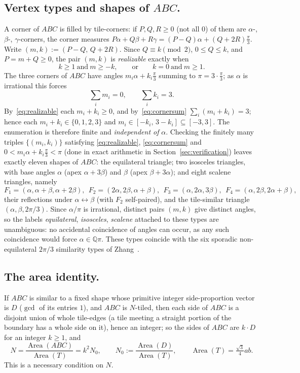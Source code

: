 \documentclass[11pt,reqno]{amsart}
\theoremstyle{plain}
\theoremstyle{definition}
\newcommand{\Q}{\mathbb{Q}}
\DeclareMathOperator{\Area}{Area}
\begin{document}
\subsection*{Vertex types and shapes of $ABC$.}\label{sub:shapes}
A corner of $ABC$ is filled by tile-corners: if $P,Q,R\ge0$ (not all $0$) of them are
$\alpha$-, $\beta$-, $\gamma$-corners, the corner measures
$P\alpha+Q\beta+R\gamma=(P-Q)\alpha+(Q+2R)\tfrac\pi3$. Write $(m,k):=(P-Q,\,Q+2R)$. Since $Q\equiv k
\pmod2$, $0\le Q\le k$, and $P=m+Q\ge0$, the pair $(m,k)$ is \emph{realizable} exactly when
\begin{equation}\label{eq:realizable}
k\ge1\ \text{and}\ m\ge -k,\qquad\text{or}\qquad k=0\ \text{and}\ m\ge1.
\end{equation}
The three corners of $ABC$ have angles $m_i\alpha+k_i\frac\pi3$ summing to $\pi=3\cdot\frac\pi3$;
as $\alpha$ is irrational this forces
\begin{equation}\label{eq:cornersum}
\textstyle\sum_i m_i=0,\qquad \sum_i k_i=3 .
\end{equation}
By~\eqref{eq:realizable} each $m_i+k_i\ge0$, and by~\eqref{eq:cornersum} $\sum_i(m_i+k_i)=3$; hence
each $m_i+k_i\in\{0,1,2,3\}$ and $m_i\in[-k_i,\,3-k_i]\subseteq[-3,3]$. The enumeration is therefore
finite and \emph{independent of} $\alpha$. Checking the finitely many triples
$\{(m_i,k_i)\}$ satisfying \eqref{eq:realizable}, \eqref{eq:cornersum} and $0<m_i\alpha+k_i\frac\pi3
<\pi$ (done in exact arithmetic in Section~\ref{sec:verification}) leaves exactly eleven shapes of
$ABC$: the equilateral triangle; two isosceles triangles, with base angles $\alpha$
(apex $\alpha+3\beta$) and $\beta$ (apex $\beta+3\alpha$); and eight scalene triangles, namely
\[
F_1=(\alpha,\alpha+\beta,\alpha+2\beta),\ \ F_2=(2\alpha,2\beta,\alpha+\beta),\ \
F_3=(\alpha,2\alpha,3\beta),\ \ F_4=(\alpha,2\beta,2\alpha+\beta),
\]
their reflections under $\alpha\leftrightarrow\beta$ (with $F_2$ self-paired), and the tile-similar
triangle $(\alpha,\beta,2\pi/3)$. Since $\alpha/\pi$ is irrational, distinct pairs $(m,k)$ give
distinct angles, so the labels \emph{equilateral}, \emph{isosceles}, \emph{scalene} attached to
these types are unambiguous: no accidental coincidence of angles can occur, as any such coincidence
would force $\alpha\in\Q\pi$. These types coincide with the six sporadic non-equilateral $2\pi/3$
similarity types of Zhang~\cite{Zhang}.

\subsection*{The area identity.}
If $ABC$ is similar to a fixed shape whose primitive integer side-proportion vector is $D$
($\gcd$ of its entries $1$), and $ABC$ is $N$-tiled, then each side of $ABC$ is a disjoint union of
whole tile-edges (a tile meeting a straight portion of the boundary has a whole side on it), hence
an integer; so the sides of $ABC$ are $k\cdot D$ for an integer $k\ge1$, and
\begin{equation}\label{eq:area}
N=\frac{\Area(ABC)}{\Area(T)}=k^2N_0,\qquad N_0:=\frac{\Area(D)}{\Area(T)},\qquad
\Area(T)=\tfrac{\sqrt3}{4}ab .
\end{equation}
This is a necessary condition on $N$.
\end{document}

